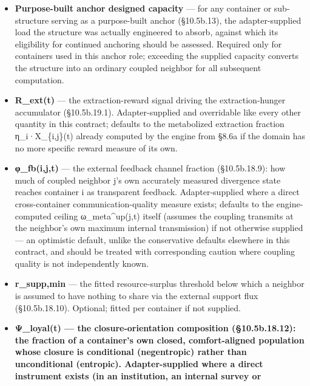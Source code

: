 \documentclass[
]{article}
\begin{document}
\begin{itemize}
  an equivalent domain-specific proxy). Optional; each defaults to 1 if
  not supplied, which assumes the low-entropy baseline configuration and
  therefore understates hazard in a container that is actually in either
  non-baseline regime --- the same conservative-default failure mode
  already flagged for χ\_supp, and worth the same caution here.
\item
  \textbf{Purpose-built anchor designed capacity} --- for any container
  or sub-structure serving as a purpose-built anchor (§10.5b.13), the
  adapter-supplied load the structure was actually engineered to absorb,
  against which its eligibility for continued anchoring should be
  assessed. Required only for containers used in this anchor role;
  exceeding the supplied capacity converts the structure into an
  ordinary coupled neighbor for all subsequent computation.
\item
  \textbf{R\_ext(t)} --- the extraction-reward signal driving the
  extraction-hunger accumulator (§10.5b.19.1). Adapter-supplied and
  overridable like every other quantity in this contract; defaults to
  the metabolized extraction fraction η\_i·X\_\{i,j\}(t) already
  computed by the engine from §8.6a if the domain has no more specific
  reward measure of its own.
\item
  \textbf{φ\_fb(i,j,t)} --- the external feedback channel fraction
  (§10.5b.18.9): how much of coupled neighbor j's own accurately
  measured divergence state reaches container i as transparent feedback.
  Adapter-supplied where a direct cross-container communication-quality
  measure exists; defaults to the engine-computed ceiling
  ω\_meta\^{}up(j,t) itself (assumes the coupling transmits at the
  neighbor's own maximum internal transmission) if not otherwise
  supplied --- an optimistic default, unlike the conservative defaults
  elsewhere in this contract, and should be treated with corresponding
  caution where coupling quality is not independently known.
\item
  \textbf{r\_supp,min} --- the fitted resource-surplus threshold below
  which a neighbor is assumed to have nothing to share via the external
  support flux (§10.5b.18.10). Optional; fitted per container if not
  supplied.
\item
  \textbf{Ψ\_loyal(t) --- the closure-orientation composition
  (§10.5b.18.12): the fraction of a container's own closed,
  comfort-aligned population whose closure is conditional (negentropic)
  rather than unconditional (entropic). Adapter-supplied where a direct
  instrument exists (in an institution, an internal survey or
}
\end{itemize}
\end{document}
